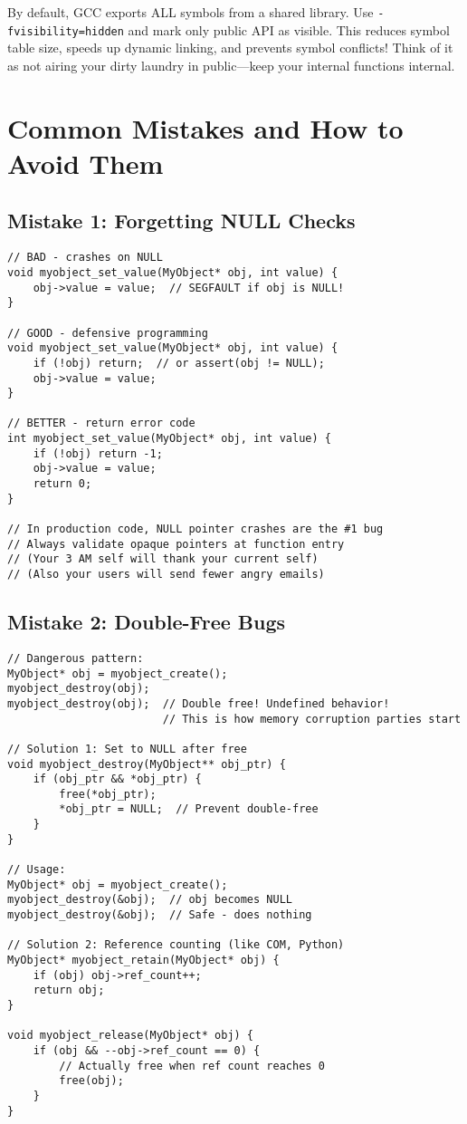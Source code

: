 \begin{warningbox}
By default, GCC exports ALL symbols from a shared library. Use \texttt{-fvisibility=hidden} and mark only public API as visible. This reduces symbol table size, speeds up dynamic linking, and prevents symbol conflicts! Think of it as not airing your dirty laundry in public---keep your internal functions internal.
\end{warningbox}

\section{Common Mistakes and How to Avoid Them}

\subsection{Mistake 1: Forgetting NULL Checks}

\begin{lstlisting}
// BAD - crashes on NULL
void myobject_set_value(MyObject* obj, int value) {
    obj->value = value;  // SEGFAULT if obj is NULL!
}

// GOOD - defensive programming
void myobject_set_value(MyObject* obj, int value) {
    if (!obj) return;  // or assert(obj != NULL);
    obj->value = value;
}

// BETTER - return error code
int myobject_set_value(MyObject* obj, int value) {
    if (!obj) return -1;
    obj->value = value;
    return 0;
}

// In production code, NULL pointer crashes are the #1 bug
// Always validate opaque pointers at function entry
// (Your 3 AM self will thank your current self)
// (Also your users will send fewer angry emails)
\end{lstlisting}

\subsection{Mistake 2: Double-Free Bugs}

\begin{lstlisting}
// Dangerous pattern:
MyObject* obj = myobject_create();
myobject_destroy(obj);
myobject_destroy(obj);  // Double free! Undefined behavior!
                        // This is how memory corruption parties start

// Solution 1: Set to NULL after free
void myobject_destroy(MyObject** obj_ptr) {
    if (obj_ptr && *obj_ptr) {
        free(*obj_ptr);
        *obj_ptr = NULL;  // Prevent double-free
    }
}

// Usage:
MyObject* obj = myobject_create();
myobject_destroy(&obj);  // obj becomes NULL
myobject_destroy(&obj);  // Safe - does nothing

// Solution 2: Reference counting (like COM, Python)
MyObject* myobject_retain(MyObject* obj) {
    if (obj) obj->ref_count++;
    return obj;
}

void myobject_release(MyObject* obj) {
    if (obj && --obj->ref_count == 0) {
        // Actually free when ref count reaches 0
        free(obj);
    }
}
\end{lstlisting}

